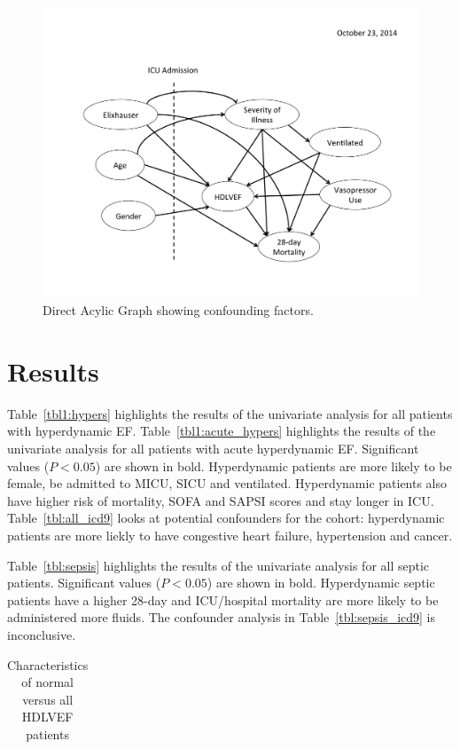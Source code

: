 \documentclass[final,10pt]{elsarticle}
\begin{document}
\begin{figure}[h]
\includegraphics[width=\linewidth,natheight=612,natwidth=792]{../figure/fig_dag.pdf}
\caption{Direct Acylic Graph showing confounding factors.}
\label{fig:cohort}
\end{figure}

\section{Results}
Table~\ref{tbl1:hypers} highlights the results of the univariate analysis 
for all patients with hyperdynamic EF. Table~\ref{tbl1:acute_hypers} highlights the results of the univariate analysis 
for all patients with acute hyperdynamic EF. Significant values ($P<0.05$) are shown in bold. 
Hyperdynamic patients are more likely to be female, be admitted to MICU, SICU 
and ventilated.
Hyperdynamic patients also have higher risk of mortality, SOFA and SAPSI scores and 
stay longer in ICU. Table~\ref{tbl:all_icd9} looks at potential confounders 
for the cohort: hyperdynamic patients are more liekly to have congestive heart failure, 
hypertension and cancer. 

Table~\ref{tbl:sepsis} highlights the results of the univariate 
analysis for all septic patients. Significant values ($P<0.05$) are shown in bold. 
Hyperdynamic septic patients have a higher 28-day and ICU/hospital mortality are more 
likely to be administered more fluids. The confounder analysis in 
Table~\ref{tbl:sepsis_icd9} is inconclusive.


\begin{table}[h]
\begin{tabular}{l c c c}
\toprule

\bottomrule
\end{tabular}
\caption{Characteristics of normal versus all HDLVEF patients}
\label{tbl:hypers}
\end{table}
\end{document}
